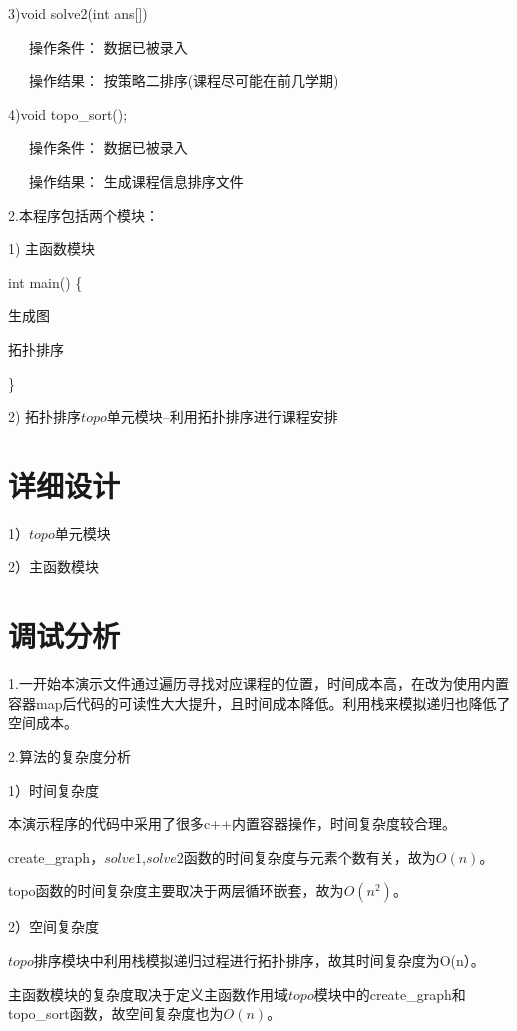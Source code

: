 \documentclass[paper=a4,UTF8,fontsize=11pt]{scrartcl} %
\numberwithin{equation}{section} %
\numberwithin{figure}{section} %
\numberwithin{table}{section} %
\begin{document}
3)void solve2(int ans[])   

\qquad \qquad \quad \ \ \ 操作条件： 数据已被录入

\qquad \qquad \quad \ \ \ 操作结果： 按策略二排序(课程尽可能在前几学期)

4)void topo\_sort();

\qquad \qquad \quad \ \ \ 操作条件： 数据已被录入

\qquad \qquad \quad \ \ \ 操作结果： 生成课程信息排序文件

2.本程序包括两个模块：

1)  主函数模块

\qquad int main() \{

\qquad \quad 生成图

\qquad \quad 拓扑排序

\}
       
2)  拓扑排序$topo$单元模块--利用拓扑排序进行课程安排

\section{详细设计}
1）$topo$单元模块


2）主函数模块


\vspace{0.3cm}
\section{调试分析}
1.一开始本演示文件通过遍历寻找对应课程的位置，时间成本高，在改为使用内置容器map后代码的可读性大大提升，且时间成本降低。利用栈来模拟递归也降低了空间成本。

2.算法的复杂度分析

1）时间复杂度

本演示程序的代码中采用了很多c++内置容器操作，时间复杂度较合理。

create\_graph，$solve1$,$solve2$函数的时间复杂度与元素个数有关，故为$O(n)$。

topo函数的时间复杂度主要取决于两层循环嵌套，故为$O(n^{2})$。

2）空间复杂度

$topo$排序模块中利用栈模拟递归过程进行拓扑排序，故其时间复杂度为O(n）。

主函数模块的复杂度取决于定义主函数作用域$topo$模块中的create\_graph和topo\_sort函数，故空间复杂度也为$O(n)$。
\vspace{0.2cm}
\end{document}
